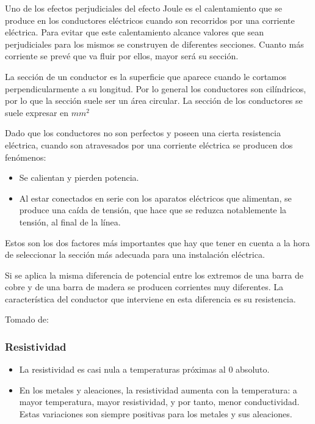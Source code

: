 \documentclass[letterpaper, 12pt]{report}
\begin{document}
Uno de los efectos perjudiciales del efecto Joule es el
calentamiento que se produce en los conductores eléctricos
cuando son recorridos por una corriente eléctrica. Para evitar
que este calentamiento alcance valores que sean perjudiciales
para los mismos se construyen de diferentes secciones. Cuanto
más corriente se prevé que va fluir por ellos, mayor será su sección.

\bigskip

La sección de un conductor es la superficie que aparece
cuando le cortamos perpendicularmente a su longitud. Por lo
general los conductores son cilíndricos, por lo que la sección
suele ser un área circular. La sección de los conductores
se suele expresar en $mm^2$

\bigskip

Dado que los conductores no son perfectos y poseen una
cierta resistencia eléctrica, cuando son atravesados por
una corriente eléctrica se producen dos fenómenos:

\begin{itemize}
	\item Se calientan y pierden potencia.
	\item Al estar conectados en serie con los aparatos eléctricos
	      que alimentan, se produce una caída de tensión, que
	      hace que se reduzca notablemente la tensión, al final
	      de la línea.
\end{itemize}

\bigskip

Estos son los dos factores más importantes que hay que
tener en cuenta a la hora de seleccionar la sección más adecuada para una
instalación eléctrica.

\bigskip

Si se aplica la misma diferencia  de potencial entre los extremos de una
barra de cobre y de una barra de madera  se producen corrientes muy diferentes.
La característica del conductor que  interviene en esta diferencia es su
resistencia.

\smallskip

Tomado de:~\cite{TemperaturaResistencia}

\subsubsection{Resistividad}

\begin{itemize}
	\item La resistividad es casi nula a temperaturas próximas al 0 absoluto.
	\item En los metales y aleaciones, la resistividad aumenta con la
	      temperatura: a mayor temperatura, mayor resistividad, y por tanto,
	      menor conductividad. Estas variaciones son siempre positivas para los
	      metales y sus aleaciones.
\end{itemize}
\end{document}
